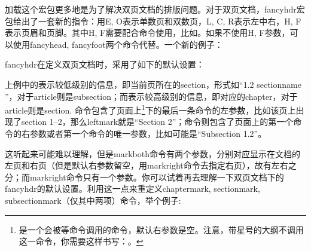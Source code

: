 {加载这个宏包更多地是为了解决双页文档的排版问题。对于双页文档，fancyhdr宏包给出了一套新的指令：用E, O表示单数页和双数页，L, C, R表示左中右，H, F表示页眉和页脚。其中H, F需要配合\latexline{\\fancyhf}命令使用，比如。如果不使用H, F参数，可以使用fancyhead, fancyfoot两个命令代替。一个新的例子：
\begin{latex}{}
\fancyhead{} %
\fancyfoot{} %
  \fancyfoot[C]{\thepage}
\end{latex}

fancyhdr在定义双页文档时，采用了如下的默认设置：
\begin{latex}{}
\fancyhead[LE,RO]{\slshape \rightmark}
\fancyhead[LO,RE]{\slshape \leftmark}
\fancyfoot[C]{\thepage}
\end{latex}

上例中的\latexline{\\rightmark}表示较低级别的信息，即当前页所在的section，形式如“1.2 sectionname ”，对于article则是subsection；而\latexline{\\leftmark}表示较高级别的信息，即对应的chapter，对于article则是section. 命令\latexline{\\leftmark}包含了页面上\latexline{\\markboth}\footnote{\latexline{\\markboth}是一个会被\latexline{\\chapter}等命令调用的命令，默认右参数是空。注意，带星号的大纲不调用这一命令，你需要这样书写：。}下的最后一条命令的左参数，比如该页上出现了section 1--2，那么leftmark就是“Section 2”；命令\latexline{\\rightmark}则包含了页面上的第一个\latexline{\\markboth}命令的右参数或者第一个\latexline{\\markright}命令的唯一参数，比如可能是“Subsection 1.2”。

这听起来可能难以理解，但是markboth命令有两个参数，分别对应显示在文档的左页和右页（但是默认右参数留空，用markright命令去指定右页），故有左右之分；而markright命令只有一个参数。你可以试着再去理解一下双页文档下的fancyhdr的默认设置。利用这一点来重定义chaptermark, sectionmark, subsectionmark（仅其中两项）命令，举个例子:
\begin{latex}{}
\renewcommand{\sectionmark}[1]{\markright{\thesection.\ #1}}
\renewcommand{\chaptermark}[1]{\markboth{\MakeUppercase{%
  \chaptername}\ \thechapter.\ #1}{}}
\end{latex}

}
